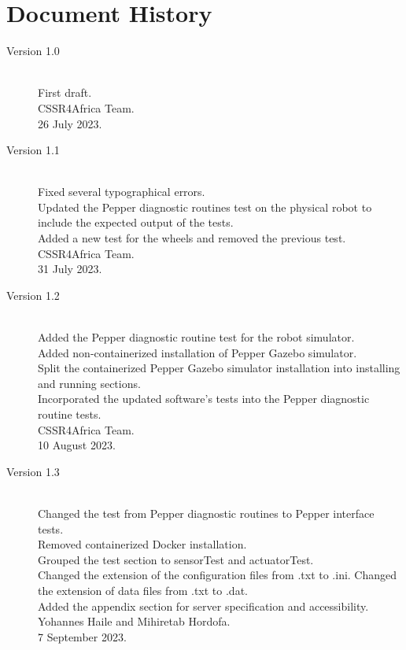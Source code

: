 \documentclass{CSSRforAfrica}
\begin{document}
{		\pagebreak
		\section*{Document History}
		\label{document_history}
		
		\begin{description}
			
			\item [Version 1.0]~\\
			First draft. \\
			CSSR4Africa Team. \\ %
			26 July 2023. %
			
			\item [Version 1.1]~\\
			Fixed several typographical errors.\\
			Updated the Pepper diagnostic routines test on the physical robot to include the expected output of the tests.\\
			Added a new test for the wheels and removed the previous test.\\
			CSSR4Africa Team.\\
			31 July 2023.
			
			\item [Version 1.2]~\\
			Added the Pepper diagnostic routine test for the robot simulator.\\
			Added non-containerized installation of Pepper Gazebo simulator.\\
			Split the containerized Pepper Gazebo simulator installation into installing and running sections.\\
			Incorporated the updated software's tests into the Pepper diagnostic routine tests.\\
			CSSR4Africa Team.\\
			10 August 2023.
			
			\item [Version 1.3]~\\
			Changed the test from Pepper diagnostic routines to Pepper interface tests.\\
			Removed containerized Docker installation.\\
			Grouped the test section to sensorTest and actuatorTest.\\
			Changed the extension of the configuration files from .txt to .ini. Changed the extension of data files from .txt to .dat. \\
			Added the appendix section for server specification and accessibility.\\
			Yohannes Haile and Mihiretab Hordofa.\\
			7 September 2023.
			

\end{description}}
\end{document}
